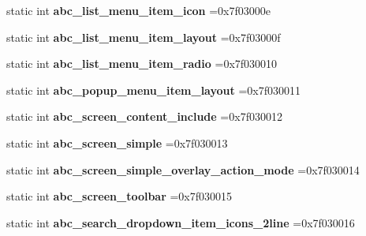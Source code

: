 \begin{DoxyCompactItemize}
static int {\bfseries abc\+\_\+list\+\_\+menu\+\_\+item\+\_\+icon} =0x7f03000e
\item 
\mbox{\label{classandroid_1_1support_1_1v4_1_1R_1_1layout_a1ad5feb30ffb43e3166e7aad73012cf3}} 
static int {\bfseries abc\+\_\+list\+\_\+menu\+\_\+item\+\_\+layout} =0x7f03000f
\item 
\mbox{\label{classandroid_1_1support_1_1v4_1_1R_1_1layout_a3f164d636b3b319fe431aef2c434b282}} 
static int {\bfseries abc\+\_\+list\+\_\+menu\+\_\+item\+\_\+radio} =0x7f030010
\item 
\mbox{\label{classandroid_1_1support_1_1v4_1_1R_1_1layout_a845d073df96ba88c3f5c262c7b0acda6}} 
static int {\bfseries abc\+\_\+popup\+\_\+menu\+\_\+item\+\_\+layout} =0x7f030011
\item 
\mbox{\label{classandroid_1_1support_1_1v4_1_1R_1_1layout_af6bea660079d44de781e7e32c2ff061d}} 
static int {\bfseries abc\+\_\+screen\+\_\+content\+\_\+include} =0x7f030012
\item 
\mbox{\label{classandroid_1_1support_1_1v4_1_1R_1_1layout_a0bb1bddf4c035384169d19fd24e44944}} 
static int {\bfseries abc\+\_\+screen\+\_\+simple} =0x7f030013
\item 
\mbox{\label{classandroid_1_1support_1_1v4_1_1R_1_1layout_a6edbec24a2e25101baf4b7dad3a7b9aa}} 
static int {\bfseries abc\+\_\+screen\+\_\+simple\+\_\+overlay\+\_\+action\+\_\+mode} =0x7f030014
\item 
\mbox{\label{classandroid_1_1support_1_1v4_1_1R_1_1layout_ac0292058064aacf124b182368e126d5b}} 
static int {\bfseries abc\+\_\+screen\+\_\+toolbar} =0x7f030015
\item 
\mbox{\label{classandroid_1_1support_1_1v4_1_1R_1_1layout_a7e183d4a604c9cb6adcff64936af8545}} 
static int {\bfseries abc\+\_\+search\+\_\+dropdown\+\_\+item\+\_\+icons\+\_\+2line} =0x7f030016
\item 

\end{DoxyCompactItemize}
